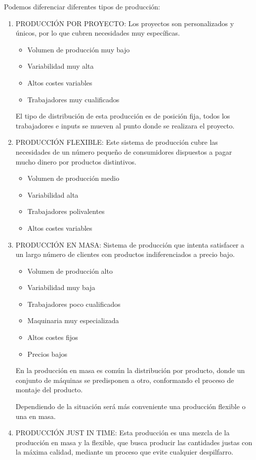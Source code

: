\documentclass[12pt, twoside, openright]{report} %
\begin{document}
Podemos diferenciar diferentes tipos de producción:
\begin{enumerate}
	\item PRODUCCIÓN POR PROYECTO: Los proyectos son personalizados y únicos, por lo que cubren necesidades muy específicas.
	      \begin{itemize}
		      \item Volumen de producción muy bajo
		      \item Variabilidad muy alta
		      \item Altos costes variables
		      \item Trabajadores muy cualificados
	      \end{itemize}
	      El tipo de distribución de esta producción es de posición fija, todos los trabajadores e inputs se mueven al punto donde se realizara el proyecto.
	\item PRODUCCIÓN FLEXIBLE: Este sistema de producción cubre las necesidades de un número pequeño de consumidores dispuestos a pagar mucho dinero por productos distintivos.
	      \begin{itemize}
		      \item Volumen de producción medio
		      \item Variabilidad alta
		      \item Trabajadores polivalentes
		      \item Altos costes variables
	      \end{itemize}
	      \pagebreak
	\item PRODUCCIÓN EN MASA: Sistema de producción que intenta satisfacer a un largo número de clientes con productos indiferenciados a precio bajo.
	      \begin{itemize}
		      \item Volumen de producción alto
		      \item Variabilidad muy baja
		      \item Trabajadores poco cualificados
		      \item Maquinaria muy especializada
		      \item Altos costes fijos
		      \item Precios bajos
	      \end{itemize}
	      En la producción en masa es común la distribución por producto, donde un conjunto de máquinas se predisponen a otro, conformando el proceso de montaje del producto.

	      Dependiendo de la situación será más conveniente una producción flexible o una en masa.
	\item PRODUCCIÓN JUST IN TIME: Esta producción es una mezcla de la producción en masa y la flexible, que busca producir las cantidades justas con la máxima calidad, mediante un proceso que evite cualquier despilfarro.
\end{enumerate}
\end{document}
